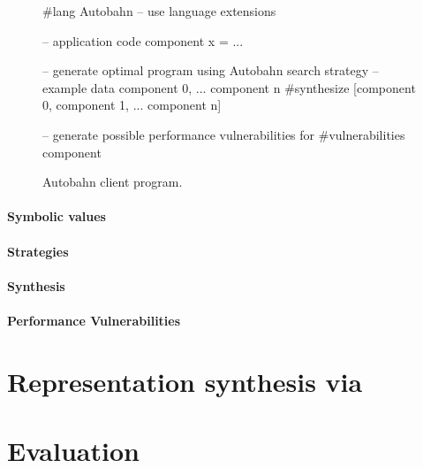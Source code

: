 \begin{figure}[t]
        
\centering
\begin{mylisting}
#lang Autobahn    -- use language extensions

-- application code
component x = ...

-- generate optimal program using Autobahn search strategy
-- example data component 0, ... component n
#synthesize [component 0, component 1, ... component n]

-- generate possible performance vulnerabilities for 
#vulnerabilities component
\end{mylisting}
\caption{Autobahn client program.}
\label{fig:autobahn-client}
\end{figure}

\paragraph*{Symbolic values}

\paragraph*{Strategies}

\paragraph*{Synthesis}

\paragraph*{Performance Vulnerabilities}



\section{Representation synthesis via \rsynth}
\label{sec:eval}

\section{Evaluation}
\label{sec:eval}


